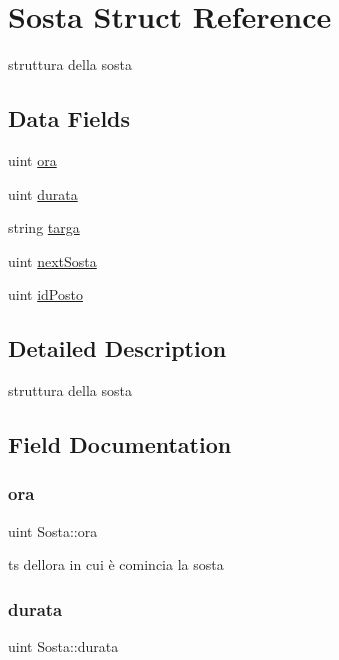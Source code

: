 \hypertarget{struct_sosta}{}\section{Sosta Struct Reference}
\label{struct_sosta}


struttura della sosta  


\subsection*{Data Fields}
\begin{DoxyCompactItemize}
\item 
uint \mbox{\hyperlink{struct_sosta_a9f985d73092d70c6eaadc3201c03d467}{ora}}
\item 
uint \mbox{\hyperlink{struct_sosta_abe05a6fb98cb52551411fd6979c8ee97}{durata}}
\item 
string \mbox{\hyperlink{struct_sosta_a90c31ad3a3b8a2d77d0eaac0927e0136}{targa}}
\item 
uint \mbox{\hyperlink{struct_sosta_a30359e54f529e95783fe1226389efe18}{next\+Sosta}}
\item 
uint \mbox{\hyperlink{struct_sosta_aace426c222cb003c1a2304f3d9cd2610}{id\+Posto}}
\end{DoxyCompactItemize}


\subsection{Detailed Description}
struttura della sosta 

\subsection{Field Documentation}
\mbox{\label{struct_sosta_a9f985d73092d70c6eaadc3201c03d467}} 
\subsubsection{\texorpdfstring{ora}{ora}}
{\footnotesize\ttfamily uint Sosta\+::ora}

ts dell\textquotesingle{}ora in cui è comincia la sosta \mbox{\label{struct_sosta_abe05a6fb98cb52551411fd6979c8ee97}} 
\subsubsection{\texorpdfstring{durata}{durata}}
{\footnotesize\ttfamily uint Sosta\+::durata}

